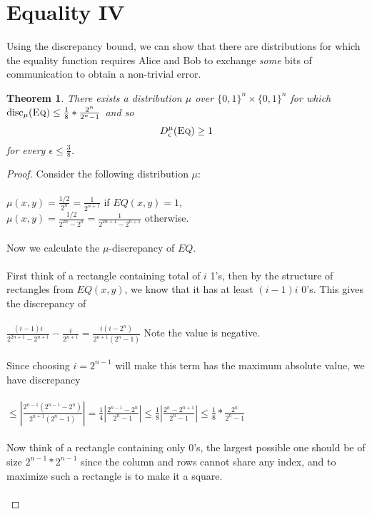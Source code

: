 \documentclass[11pt,oneside]{book}
\theoremstyle{plain}
\newtheorem{theorem}{Theorem}
\theoremstyle{definition}
\theoremstyle{plain}
\newcommand{\disc}{\mathrm{disc}}
\newcommand{\Eq}{\textsc{Eq}}
\begin{document}
 \section{Equality IV}

Using the discrepancy bound, we can show that there are distributions for which the equality function requires Alice and Bob to exchange \emph{some} bits of communication to obtain a non-trivial error.

\begin{theorem}
	There exists a distribution $\mu$ over $\{0,1\}^n \times \{0,1\}^n$ for which 
	$
	\disc_\mu(\Eq) \leq \frac18*\frac{2^n}{2^n-1}
	$
	and so
	\[
	D^\mu_\epsilon(\Eq) \ge 1
	\]
	for every $\epsilon \le \frac38$.
\end{theorem}

\begin{proof}
	Consider the following distribution $\mu$: \\
	\\
	$\mu(x,y) = \frac{1/2}{2^n} = \frac{1}{2^{n+1}}$ if $EQ(x,y) = 1$,\\
	$\mu(x,y) = \frac{1/2}{2^{2n}-2^n} = \frac{1}{2^{2n+1}-2^{n+1}}$ otherwise. \\
	\\
	Now we calculate the $\mu$-discrepancy of $EQ$. \\
	\\
	First think of a rectangle containing total of $i$ 1's, then by the structure of rectangles from $EQ(x,y)$, we know that it has at least $(i-1)i$ 0's. This gives the discrepancy of \\
	\\
	$\frac{(i-1)i}{2^{2n+1}-2^{n+1}}-\frac{i}{2^{n+1}} = \frac{i(i-2^n)}{2^{n+1}(2^n-1)}$ Note the value is negative.\\
	\\
	Since choosing $i=2^{n-1}$ will make this term has the maximum absolute value, we have discrepancy\\
	\\
	$\leq |\frac{2^{n-1}(2^{n-1}-2^n)}{2^{n+1}(2^n-1)}| = \frac14|\frac{2^{n-1}-2^{n}}{2^{n}-1}| \leq \frac18|\frac{2^{n}-2^{n+1}}{2^{n}-1}| \leq \frac18*\frac{2^n}{2^n-1}$\\
	\\
	Now think of a rectangle containing only 0's, the largest possible one should be of size $2^{n-1}*2^{n-1}$ since the column and rows cannot share any index, and to maximize such a rectangle is to make it a square. \\ 
	\\

\end{proof}
\end{document}
